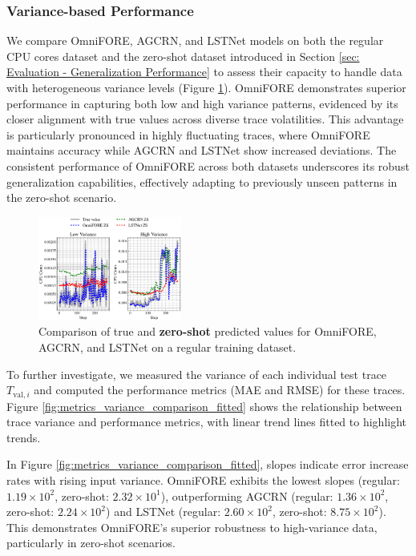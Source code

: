 \subsubsection{\textbf{Variance-based Performance}}

We compare OmniFORE, AGCRN, and LSTNet models on both the regular CPU cores dataset and the zero-shot dataset introduced in Section \ref{sec: Evaluation - Generalization Performance} to assess their capacity to handle data with heterogeneous variance levels (Figure \ref{fig:zs_sample_trace_comparison}). OmniFORE demonstrates superior performance in capturing both low and high variance patterns, evidenced by its closer alignment with true values across diverse trace volatilities. This advantage is particularly pronounced in highly fluctuating traces, where OmniFORE maintains accuracy while AGCRN and LSTNet show increased deviations. The consistent performance of OmniFORE across both datasets underscores its robust generalization capabilities, effectively adapting to previously unseen patterns in the zero-shot scenario. 

\begin{figure}%
\centering
\includegraphics[width=0.42\textwidth]{img/zs_sample_trace_comparison.eps}
\caption{Comparison of true and \textbf{zero-shot} predicted values for OmniFORE, AGCRN, and LSTNet on a regular training dataset.}
\label{fig:zs_sample_trace_comparison}
\end{figure}

To further investigate, we measured the variance of each individual test trace $T_{\text{val}, i}$ and computed the performance metrics (MAE and RMSE) for these traces. Figure \ref{fig:metrics_variance_comparison_fitted} shows the relationship between trace variance and performance metrics, with linear trend lines fitted to highlight trends.

In Figure \ref{fig:metrics_variance_comparison_fitted}, slopes indicate error increase rates with rising input variance. OmniFORE exhibits the lowest slopes (regular: $1.19 \times 10^2$, zero-shot: $2.32 \times 10^1$), outperforming AGCRN (regular: $1.36 \times 10^2$, zero-shot: $2.24 \times 10^2$) and LSTNet (regular: $2.60 \times 10^2$, zero-shot: $8.75 \times 10^2$). This demonstrates OmniFORE's superior robustness to high-variance data, particularly in zero-shot scenarios.

